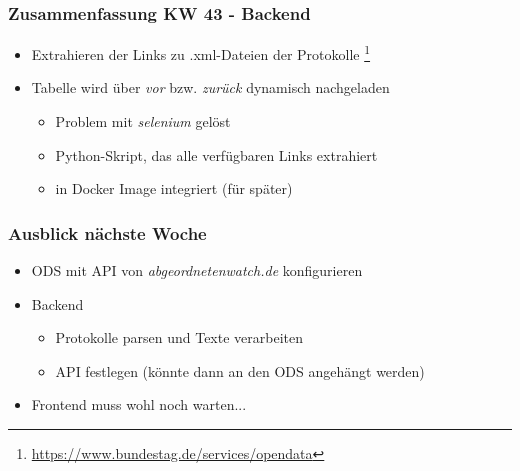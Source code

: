 \documentclass{beamer}
\newcommand{\cw}{43}
\begin{document}
  \begin{frame}
    \frametitle{Zusammenfassung KW \cw{} - Backend}
    \begin{itemize}
      \item Extrahieren der Links zu .xml-Dateien der Protokolle
        \footnote{\url{https://www.bundestag.de/services/opendata}}
      \item Tabelle wird über \textit{vor} bzw. \textit{zurück} dynamisch
        nachgeladen
        \begin{itemize}
          \item Problem mit \textit{selenium} gelöst
          \item Python-Skript, das alle verfügbaren Links extrahiert
          \item in Docker Image integriert (für später)
        \end{itemize}
      \end{itemize}
  \end{frame}

  \begin{frame}
    \frametitle{Ausblick nächste Woche}
      \begin{itemize}
        \item ODS mit API von \textit{abgeordnetenwatch.de} konfigurieren
        \item Backend 
          \begin{itemize}
            \item Protokolle parsen und Texte verarbeiten
            \item API festlegen (könnte dann an den ODS angehängt werden)
          \end{itemize}
        \item Frontend muss wohl noch warten...
      \end{itemize}
  \end{frame}
\end{document}

